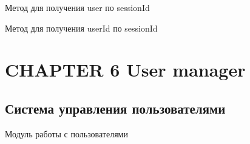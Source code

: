 \documentclass[letterpaper,10pt,english]{sphinxmanual}
\begin{document}
\begin{fulllineitems}
\begin{fulllineitems}
\label{sessionManager:mainServer.sessionManager.SessionManager.getUser}
Метод для получения user по sessionId

\end{fulllineitems}


\begin{fulllineitems}
\label{sessionManager:mainServer.sessionManager.SessionManager.getUserId}
Метод для получения userId по sessionId

\end{fulllineitems}


\end{fulllineitems}



\chapter{CHAPTER 6 User manager}
\label{userManager:chapter-6-user-manager}\label{userManager::doc}

\section{Система управления пользователями}
\label{userManager:id1}\label{userManager:module-mainServer.userManager}
Модуль работы с пользователями
\end{document}

